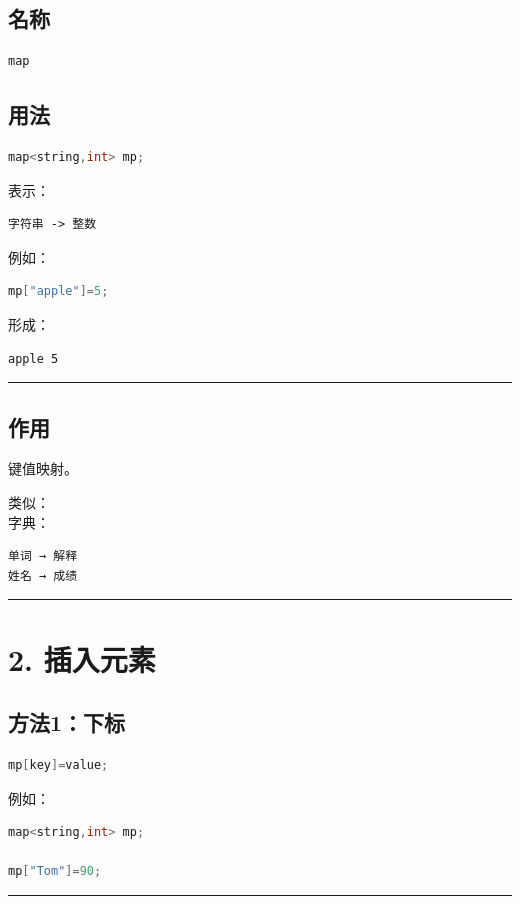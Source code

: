 \documentclass[9pt,twocolumn]{extarticle}
\begin{document}
\subsection{名称}
\begin{lstlisting}[language=C++]
map
\end{lstlisting}

\subsection{用法}
\begin{lstlisting}[language=C++]
map<string,int> mp;
\end{lstlisting}
表示：
\begin{lstlisting}
字符串 -> 整数
\end{lstlisting}
例如：
\begin{lstlisting}[language=C++]
mp["apple"]=5;
\end{lstlisting}
形成：
\begin{lstlisting}
apple 5
\end{lstlisting}

\noindent\rule{\linewidth}{0.4pt}

\subsection{作用}
键值映射。

类似：\\
字典：
\begin{lstlisting}
单词 → 解释
姓名 → 成绩
\end{lstlisting}

\noindent\rule{\linewidth}{0.4pt}

\section{2. 插入元素}

\subsection{方法1：下标}
\begin{lstlisting}[language=C++]
mp[key]=value;
\end{lstlisting}
例如：
\begin{lstlisting}[language=C++]
map<string,int> mp;

mp["Tom"]=90;
\end{lstlisting}

\noindent\rule{\linewidth}{0.4pt}
\end{document}
